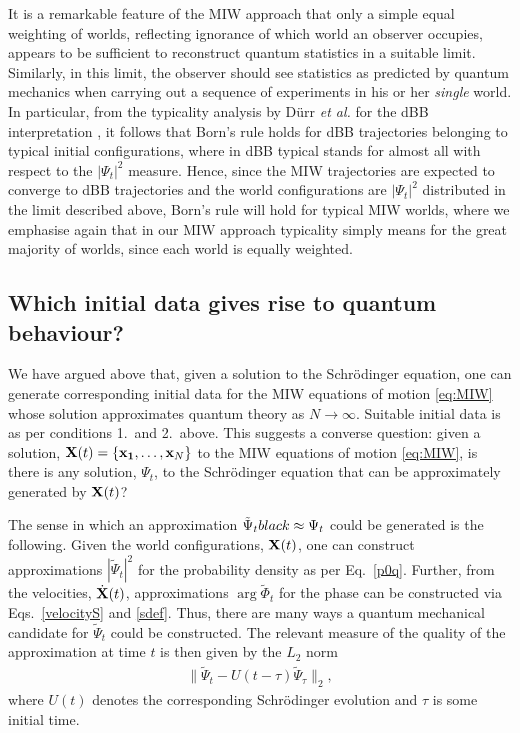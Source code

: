 \documentclass[12pt, aps,pra,amsmath,amssymb,superscriptaddress]{revtex4-2}
\newcommand{\cu}[1]{\left\{ {#1} \right\}}
\renewcommand{\(}{\left(}
\renewcommand{\)}{\right)}
\newcommand{\red}{\color{red}}
\newcommand{\blk}{\color{black}}
\newcommand{\blu}{\color{blue}}
\newcommand{\grn}{\color{ngreen}}
\renewcommand\grn{\blk}
\renewcommand\blu{\blk}
\renewcommand\red{\blk}
\begin{document}
It is a remarkable feature of the MIW approach that only a simple equal
weighting of worlds, reflecting ignorance of which world an observer occupies,
appears to be sufficient to reconstruct quantum statistics in \blu a \blk suitable
limit.  Similarly, in this limit, the observer should see statistics as
predicted by quantum mechanics when carrying out a sequence of experiments in
his or her {\it single} world.  In particular, from the typicality
    analysis by D\"urr {\it et al.} for the dBB interpretation
    \cite{quantumequilibrium}, it follows that Born's rule holds for dBB
    trajectories belonging \blu to \blk typical initial configurations, where in dBB
    typical stands for almost all with respect to the $|\Psi_t|^2$ measure.  Hence,
    since the MIW trajectories are expected to converge to dBB trajectories and
    the world configurations are $|\Psi_t|^2$ distributed in the limit
    described above, Born's rule will hold for typical MIW worlds, where we
    emphasise again that in our MIW approach typicality simply means for the
    great majority of worlds, since each world is equally weighted.

\blu
\subsection{Which initial data gives rise to quantum behaviour?}

 We \grn have argued \blu above \grn that, given a solution to the Schr\"odinger equation,  one
can generate \grn corresponding initial data  for \grn the MIW equations of motion
\eqref{eq:MIW} whose solution approximates quantum theory as $N\to\infty$. Suitable \grn initial data   is as per \grn
conditions 1.~and 2.~above.
\red This suggests a converse question: \grn given a solution, \red ${\bf X}(t)=\cu{{\bf x_1}, \ldots , {\bf x}_N}$ 
\grn to the MIW equations of motion
\eqref{eq:MIW}, \red is \grn there is any solution, $\Psi_t$, to the Schr\"odinger
equation that can be approximately  generated \red by ${\bf X}(t)$? 

The sense in which an  \blu approximation $\tilde{\Psi}_t \red \approx \Psi_t$ \red could be  generated \red is the following. 
\grn Given the world configurations, ${\bf X}(t)$, one can \blu construct approximations  $|\tilde{\Psi}_t|^2$ for the probability density 
 as per \grn Eq.~\eqref{p0q}.    Further, from \grn the velocities, \red $\dot {\bf X}(t)$, \blk 
 approximations $\arg \tilde \Phi_t$ for the phase can be constructed via  \grn  Eqs.~\eqref{velocityS} \blu and \grn \eqref{sdef}.   Thus, \red 
there are many ways a quantum
mechanical candidate for $\tilde{\Psi}_t$ could \grn be constructed.  The relevant measure of
the quality of the approximation at time $t$ is then given by the $L_2$ norm
\begin{align}
    \label{eq:MIW_QM_approx} \|\tilde{\Psi}_t-U(t-\tau)\tilde{\Psi}_\tau\|_2,
\end{align}
where $U(t)$ denotes the corresponding Schr\"odinger evolution and $\tau$ is
some initial time. \blk
\end{document}
